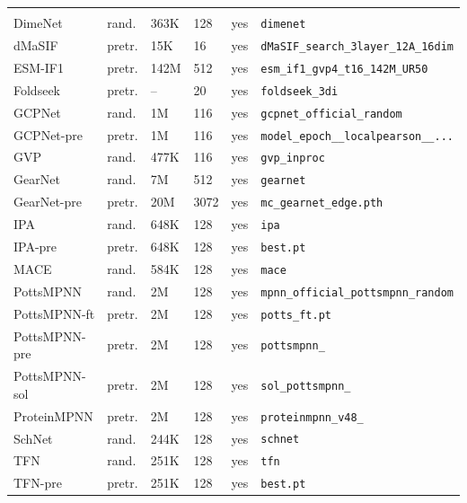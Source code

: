 \begin{longtable}{P{2.15cm}P{1cm}P{.85cm}P{.6cm}P{.85cm}P{6.25cm}}
 \\*
DimeNet       & rand.  & 363K & 128 & yes & \texttt{dimenet} \\
dMaSIF        & pretr. & 15K  & 16  & yes & \texttt{dMaSIF\_\allowbreak search\_\allowbreak 3layer\_\allowbreak 12A\_\allowbreak 16dim} \\
ESM-IF1       & pretr. & 142M & 512 & yes & \texttt{esm\_\allowbreak if1\_\allowbreak gvp4\_\allowbreak t16\_\allowbreak 142M\_\allowbreak UR50} \\
Foldseek      & pretr. & --   & 20  & yes & \texttt{foldseek\_\allowbreak 3di} \\
GCPNet        & rand.  & 1M   & 116 & yes & \texttt{gcpnet\_\allowbreak official\_\allowbreak random} \\
GCPNet-pre    & pretr. & 1M   & 116 & yes & \texttt{model\_\allowbreak epoch\_\_\allowbreak localpearson\_\_...} \\
GVP           & rand.  & 477K & 116 & yes & \texttt{gvp\_\allowbreak inproc} \\
GearNet       & rand.  & 7M   & 512 & yes & \texttt{gearnet} \\
GearNet-pre   & pretr. & 20M  & 3072 & yes & \texttt{mc\_\allowbreak gearnet\_\allowbreak edge.pth} \\
IPA           & rand.  & 648K & 128 & yes & \texttt{ipa} \\
IPA-pre       & pretr. & 648K & 128 & yes & \texttt{best.pt} \\
MACE          & rand.  & 584K & 128 & yes & \texttt{mace} \\
PottsMPNN     & rand.  & 2M   & 128 & yes & \texttt{mpnn\_\allowbreak official\_\allowbreak pottsmpnn\_\allowbreak random} \\
PottsMPNN-ft  & pretr. & 2M   & 128 & yes & \texttt{potts\_\allowbreak ft.pt} \\
PottsMPNN-pre & pretr. & 2M   & 128 & yes & \texttt{pottsmpnn\_} \\
PottsMPNN-sol & pretr. & 2M   & 128 & yes & \texttt{sol\_\allowbreak pottsmpnn\_} \\
ProteinMPNN   & pretr. & 2M   & 128 & yes & \texttt{proteinmpnn\_\allowbreak v48\_} \\
SchNet        & rand.  & 244K & 128 & yes & \texttt{schnet} \\
TFN           & rand.  & 251K & 128 & yes & \texttt{tfn} \\
TFN-pre       & pretr. & 251K & 128 & yes & \texttt{best.pt} \\


\end{longtable}
